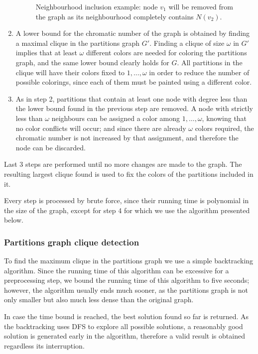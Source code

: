\begin{enumerate}
\begin{figure}
\begin{tikzpicture}
	\end{tikzpicture} 
\caption{Neighbourhood inclusion example: node $v_1$ will be removed from the graph as its neighbourhood completely contains $N(v_2)$.}
	\label{fig:neighbourinclusion}
\end{figure}
	
	\item{A lower bound for the chromatic number of the graph is obtained by finding a maximal clique in the partitions graph $G'$. Finding a clique of size $\omega$ in $G'$ implies that at least $\omega$ different colors are needed for coloring the partitions graph, and the same lower bound clearly holds for $G$. All partitions in the clique will have their colors fixed to $1,\ldots,\omega$ in order to reduce the number of possible colorings, since each of them must be painted using a different color.}
	\item{As in step 2, partitions that contain at least one node with degree less than the lower bound found in the previous step are removed. A node with strictly less than $\omega$ neighbours can be assigned a color among $1,\ldots,\omega$, knowing that no color conflicts will occur; and since there are already $\omega$ colors required, the chromatic number is not increased by that assignment, and therefore the node can be discarded.}
\end{enumerate}

Last 3 steps are performed until no more changes are made to the graph. The resulting largest clique found is used to fix the colors of the partitions included in it. 

Every step is processed by brute force, since their running time is polynomial in the size of the graph, except for step 4 for which we use the algorithm presented below.

\subsubsection*{Partitions graph clique detection}

To find the maximum clique in the partitions graph we use a simple backtracking algorithm. Since the running time of this algorithm can be excessive for a preprocessing step, we bound the running time of this algorithm to five seconds; however, the algorithm usually ends much sooner, as the partitions graph is not only smaller but also much less dense than the original graph. 

In case the time bound is reached, the best solution found so far is returned. As the backtracking uses DFS to explore all possible solutions, a reasonably good solution is generated early in the algorithm, therefore a valid result is obtained regardless its interruption.

